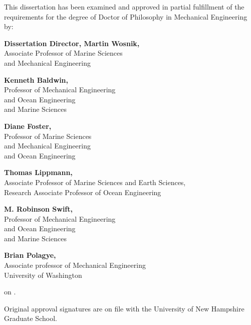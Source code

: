 \newpage
\vspace*{0.75 in}

\begin{singlespace}


\noindent \small{This dissertation has been examined and approved in partial fulfillment of the requirements for the degree of Doctor of Philosophy in Mechanical Engineering by:}
\vspace{0.5in}

\hfill                                      %
\parbox{4in} {                               %
\textbf{Dissertation Director, Martin Wosnik,}\\ \small{Associate Professor of Marine Sciences\\ and Mechanical Engineering}
\vspace{0.2in}

 {\textbf{Kenneth Baldwin,}\\ \small{Professor of Mechanical Engineering \\ and Ocean Engineering\\ and Marine Sciences}}
\vspace{0.2in}

{\textbf{Diane Foster,}\\  \small {Professor of Marine Sciences\\ and Mechanical Engineering\\ and Ocean Engineering}}
\vspace{0.2in}

 {\textbf{Thomas Lippmann,}\\   \small{Associate Professor of Marine Sciences and Earth Sciences,\\ Research Associate Professor of Ocean Engineering}}
\vspace{0.2in}

{\textbf{M. Robinson Swift,}\\ \small{Professor of Mechanical Engineering \\ and Ocean Engineering\\ and Marine Sciences}}
\vspace{0.2in}

{\textbf{Brian Polagye,}\\ \small{Associate professor of Mechanical Engineering \\ University of Washington}}
\vspace{0.2in}

on .\\}


\vspace{0.5 in}
\noindent \small{Original approval signatures are on file with the University of New Hampshire Graduate School.}


\end{singlespace}
\vspace*{\fill}
